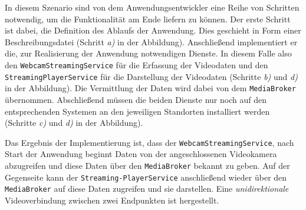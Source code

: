   In diesem Szenario sind von dem Anwendungsentwickler eine Reihe von Schritten notwendig, um die Funktionalität am Ende liefern zu können. Der erste Schritt ist dabei, die Definition des Ablaufs der Anwendung. Dies geschieht in Form einer Beschreibungsdatei (Schritt \emph{a)} in der Abbildung). Anschließend implementiert er die, zur Realisierung der Anwendung notwendigen Dienste. In diesem Falle also den \verb!WebcamStreamingService!  für die Erfassung der Videodaten und den \verb!StreamingPlayerService! für die Darstellung der Videodaten (Schritte \emph{b)} und \emph{d)} in der Abbildung). Die Vermittlung der Daten wird dabei von dem \verb!MediaBroker! übernommen. Abschließend müssen die beiden Dienste nur noch auf den entsprechenden Systemen an den jeweiligen Standorten installiert werden (Schritte \emph{c)} und \emph{d)} in der Abbildung).
  
  Das Ergebnis der Implementierung ist, dass der \verb!WebcamStreamingService!, nach Start der Anwendung beginnt Daten von der angeschlossenen Videokamera abzugreifen und diese Daten über den \verb!MediaBroker! bekannt zu geben. Auf der Gegenseite kann der \verb!Streaming-PlayerService! anschließend wieder über den \verb!MediaBroker! auf diese Daten zugreifen und sie darstellen. Eine \emph{unidirektionale} Videoverbindung zwischen zwei Endpunkten ist hergestellt.


